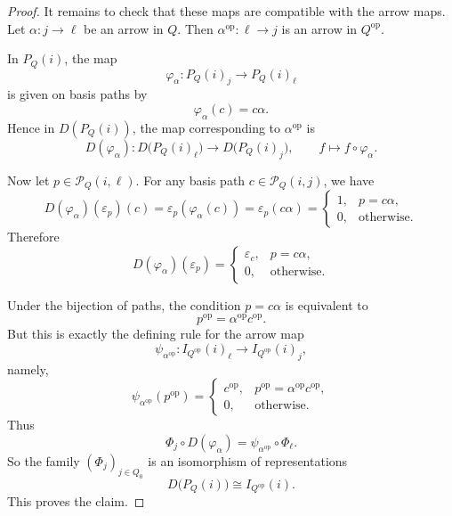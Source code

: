 \documentclass[11pt, a4paper]{article}
\begin{document}
\begin{enumerate}[leftmargin=*, label=\textbf{\arabic*.}]
\begin{proof}
    It remains to check that these maps are compatible with the arrow maps.
    Let $\alpha\colon j\to \ell$ be an arrow in $Q$. Then $\alpha^{\operatorname{op}}\colon \ell\to j$
    is an arrow in $Q^{\operatorname{op}}$.
    
    In $P_Q(i)$, the map
    \[
    \varphi_\alpha\colon P_Q(i)_j\to P_Q(i)_\ell
    \]
    is given on basis paths by
    \[
    \varphi_\alpha(c)=c\alpha.
    \]
    Hence in $D(P_Q(i))$, the map corresponding to $\alpha^{\operatorname{op}}$ is
    \[
    D(\varphi_\alpha)\colon D\bigl(P_Q(i)_\ell\bigr)\to D\bigl(P_Q(i)_j\bigr),
    \qquad
    f\longmapsto f\circ \varphi_\alpha.
    \]
    
    Now let $p\in \mathcal P_Q(i,\ell)$. For any basis path $c\in \mathcal P_Q(i,j)$, we have
    \[
    D(\varphi_\alpha)(\varepsilon_p)(c)
    =
    \varepsilon_p(\varphi_\alpha(c))
    =
    \varepsilon_p(c\alpha)
    =
    \begin{cases}
    1,& p=c\alpha,\\
    0,& \text{otherwise}.
    \end{cases}
    \]
    Therefore
    \[
    D(\varphi_\alpha)(\varepsilon_p)
    =
    \begin{cases}
    \varepsilon_c,& p=c\alpha,\\
    0,& \text{otherwise}.
    \end{cases}
    \]
    
    Under the bijection of paths, the condition $p=c\alpha$ is equivalent to
    \[
    p^{\operatorname{op}}=\alpha^{\operatorname{op}}c^{\operatorname{op}}.
    \]
    But this is exactly the defining rule for the arrow map
    \[
    \psi_{\alpha^{\operatorname{op}}}\colon
    I_{Q^{\operatorname{op}}}(i)_\ell\to I_{Q^{\operatorname{op}}}(i)_j,
    \]
    namely,
    \[
    \psi_{\alpha^{\operatorname{op}}}(p^{\operatorname{op}})
    =
    \begin{cases}
    c^{\operatorname{op}},& p^{\operatorname{op}}=\alpha^{\operatorname{op}}c^{\operatorname{op}},\\
    0,& \text{otherwise}.
    \end{cases}
    \]
    Thus
    \[
    \Phi_j\circ D(\varphi_\alpha)=\psi_{\alpha^{\operatorname{op}}}\circ \Phi_\ell.
    \]
    So the family $(\Phi_j)_{j\in Q_0}$ is an isomorphism of representations
    \[
    D\bigl(P_Q(i)\bigr)\cong I_{Q^{\operatorname{op}}}(i).
    \]
    This proves the claim.
    \end{proof}

\end{enumerate}
\end{document}
